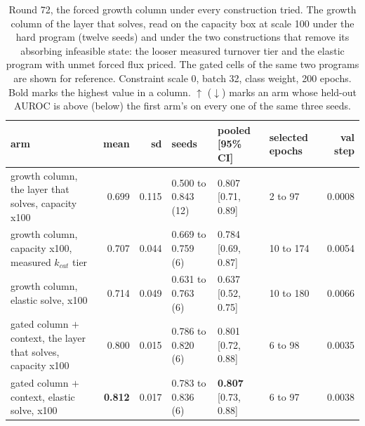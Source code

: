 \begin{table}[H]
  \centering
  \scriptsize
  \caption[Round 72, the forced growth column under every construction tried]{Round 72, the forced growth column under every construction tried. The growth column of the layer that solves, read on the capacity box at scale 100 under the hard program (twelve seeds) and under the two constructions that remove its absorbing infeasible state: the looser measured turnover tier and the elastic program with unmet forced flux priced. The gated cells of the same two programs are shown for reference. Constraint scale 0, batch 32, class weight, 200 epochs. Bold marks the highest value in a column. $\uparrow$ ($\downarrow$) marks an arm whose held-out AUROC is above (below) the first arm's on every one of the same three seeds.}
  \label{tab:w89}
  \begin{tabular}{@{}lrrlllr@{}}
    \hline
    arm & mean & sd & seeds & pooled [95\% CI] & selected epochs & val step \\
    \hline
    growth column, the layer that solves, capacity x100 & 0.699 & 0.115 & 0.500 to 0.843 (12) & 0.807 [0.71, 0.89] & 2 to 97 & 0.0008 \\
    growth column, capacity x100, measured $k_{cat}$ tier & 0.707 & 0.044 & 0.669 to 0.759 (6) & 0.784 [0.69, 0.87] & 10 to 174 & 0.0054 \\
    growth column, elastic solve, x100 & 0.714 & 0.049 & 0.631 to 0.763 (6) & 0.637 [0.52, 0.75] & 10 to 180 & 0.0066 \\
    gated column $+$ context, the layer that solves, capacity x100 & 0.800 & 0.015 & 0.786 to 0.820 (6) & 0.801 [0.72, 0.88] & 6 to 98 & 0.0035 \\
    gated column $+$ context, elastic solve, x100 & \textbf{0.812} & 0.017 & 0.783 to 0.836 (6) & \textbf{0.807} [0.73, 0.88] & 6 to 97 & 0.0038 \\
    \hline
  \end{tabular}
\end{table}
